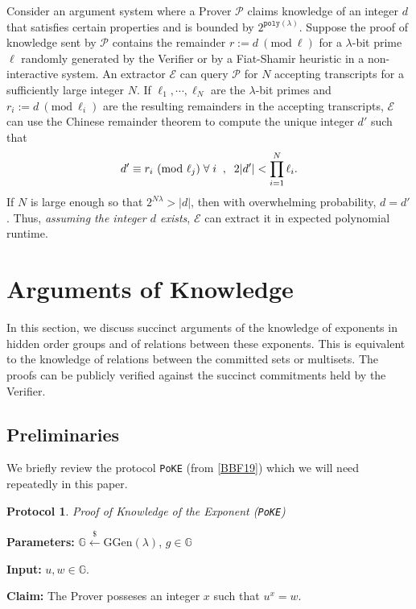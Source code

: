 \documentclass[11pt, lettersize, notitlepage, leqno, footskip=0.6cm]{article}
\newcommand{\pl}{\prod\limits}
\newcommand{\ttt}{\texttt}
\newcommand{\mc}{\mathcal}
\newcommand{\mb}{\mathbb}
\newcommand{\mr}{\mathrm}
\newcommand{\lam}{\lambda}
\newcommand{\lamb}{\lambda}
\newcommand{\mP}{\mc{P}}
\newcommand{\vs}{\vspace{-0.15cm}}
\newcommand{\noin}{\noindent}
\newcommand{\op}{overwhelming probability}
\newcommand{\Mod}[1]{\ (\mathrm{mod}\ #1)}
\newcommand{\E}{\mc{E}}
\newtheorem{Prot}[Thm]{Protocol}
\numberwithin{equation}{section}
\begin{document}
Consider an argument system where a Prover $\mP$ claims knowledge of an integer $d$ that satisfies certain properties and is bounded by $2^{\ttt{poly}(\lam)}$. Suppose the proof of knowledge sent by $\mP$ contains the remainder $r:= d\Mod{\ell}$ for a $\lam$-bit prime $\ell$ randomly generated by the Verifier or by a Fiat-Shamir heuristic in a non-interactive system. An extractor $\E$ can query $\mP$ for $N$ accepting transcripts for a sufficiently large integer $N$. If $\ell_1,\cdots,\ell_N$ are the $\lam$-bit primes and $r_i:= d\Mod{\ell_i}$ are the resulting remainders in the accepting transcripts, $\E$ can use the Chinese remainder theorem to compute the unique integer $d'$ such that \vs $$d'\equiv r_i\Mod{\ell_j}\;\forall\;i\;\;,\;\; 2|d'| < \pl_{i=1}^N \ell_i. \vs $$ If $N$ is large enough so that $2^{N\lam} > |d|$, then with \op, $d = d'$. Thus, \textit{assuming the integer $d$ exists}, $\E$ can extract it in expected polynomial runtime.



\section{\fontsize{12}{12}\selectfont Arguments of Knowledge  }

In this section, we discuss succinct arguments of the knowledge of exponents in hidden order groups and of relations between these exponents. This is equivalent to the knowledge of relations between the committed sets or multisets. The proofs can be publicly verified against the succinct commitments held by the Verifier.

\subsection{\fontsize{11}{11}\selectfont Preliminaries}

\noin We briefly review the protocol \verb|PoKE| (from \hyperlink{BBF19}{[BBF19]}) which we will need repeatedly in this paper.

\begin{Prot} \normalfont \textit{Proof of Knowledge of the Exponent} (\verb|PoKE|) \end{Prot} \vspace{-0.3cm}

\noin \textbf{Parameters:} $\mb{G}\xleftarrow{\$} \mr{GGen}(\lamb)$,\; $g\in \mb{G}$

\noin \textbf{Input:} $u, w \in \mb{G}$.

\noin \textbf{Claim:} The Prover posseses an integer $x$ such that $u^x = w$. 
\end{document}
